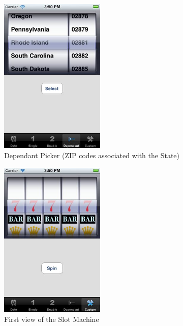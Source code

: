 \documentclass[a4paper, 12pt, final]{article}
\begin{document}
\begin{figure}[!h] %
\centering
\includegraphics[width=5cm]{4.jpg} %
\caption{Dependant Picker (ZIP codes associated with the State)} %
\label{api} %
\end{figure} %
 

\begin{figure}[!h] %
\centering
\includegraphics[width=5cm]{5.jpg} %
\caption{First view of the Slot Machine} %
\label{api} %
\end{figure} %
\end{document}
